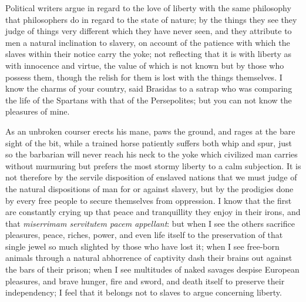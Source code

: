 \documentclass[11pt,twocolumn]{ltugboat}
\begin{document}
Political writers argue in regard to the love of liberty with the same
philosophy that philosophers do in regard to the state of nature; by
the things they see they judge of things very different which they
have never seen, and they attribute to men a natural inclination to
slavery, on account of the patience with which the slaves within their
notice carry the yoke; not reflecting that it is with liberty as with
innocence and virtue, the value of which is not known but by those who
possess them, though the relish for them is lost with the things
themselves. I know the charms of your country, said Brasidas to a
satrap who was comparing the life of the Spartans with that of the
Persepolites; but you can not know the pleasures of mine.

As an unbroken courser erects his mane, paws the ground, and rages at
the bare sight of the bit, while a trained horse patiently suffers
both whip and spur, just so the barbarian will never reach his neck to
the yoke which civilized man carries without murmuring but prefers the
most stormy liberty to a calm subjection. It is not therefore by the
servile disposition of enslaved nations that we must judge of the
natural dispositions of man for or against slavery, but by the
prodigies done by every free people to secure themselves from
oppression. I know that the first are constantly crying up that peace
and tranquillity they enjoy in their irons, and that \textit{miserrimam
servitutem pacem appellant}: but when I see the others sacrifice
pleasures, peace, riches, power, and even life itself to the
preservation of that single jewel so much slighted by those who have
lost it; when I see free-born animals through a natural abhorrence of
captivity dash their brains out against the bars of their prison; when
I see multitudes of naked savages despise European pleasures, and
brave hunger, fire and sword, and death itself to preserve their
independency; I feel that it belongs not to slaves to argue concerning
liberty.
\end{document}
